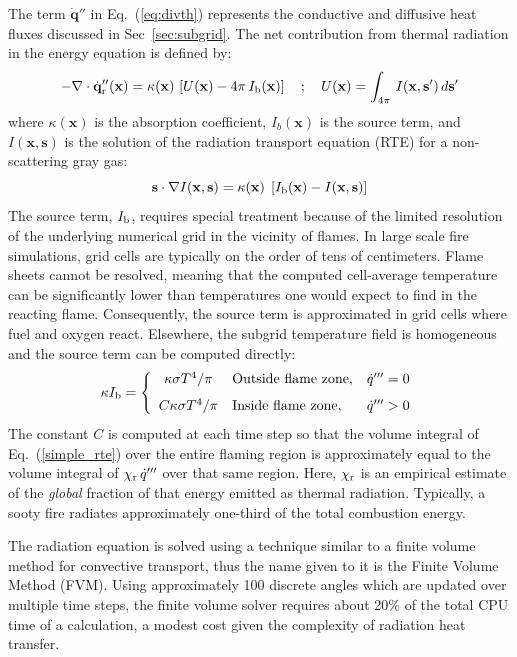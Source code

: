 \documentclass[journal,article,atmosphere,submit,moreauthors,pdftex]{Definitions_Review_Process/mdpi}
\newcommand{\bx}{\mathbf{x}}
\newcommand{\bs}{\mathbf{s}}
\begin{document}
The term $\dot{\mathbf{q}}''$ in Eq.~(\ref{eq:divth}) represents the conductive and diffusive heat fluxes discussed in Sec~\ref{sec:subgrid}. The net contribution from thermal radiation in the energy equation is defined by:
\begin{equation}
   -\nabla \cdot \dot{\mathbf{q}}_{\rm r}''(\bx) =
    \kappa(\bx) \, \left[ U(\bx) - 4 \pi \, I_{\rm b}(\bx) \right]  \quad ; \quad
    U(\bx) = \int_{4\pi} \, I(\bx,\bs') \, d\bs'  \label{simple_rte}
\end{equation}
where $\kappa(\bx)$ is the absorption coefficient, $I_b(\bx)$ is the source term, and $I(\bx,\bs)$ is the solution of the radiation transport equation (RTE) for a non-scattering gray gas:
\begin{equation}
   \bs \cdot \nabla I(\bx,\bs) = \kappa(\bx) \; \left[ I_{\rm b}(\bx) - I(\bx,\bs) \right] \label{bandRTE1}
\end{equation}
The source term, $I_{\rm b}$, requires special treatment because of the limited resolution of the underlying numerical grid in the vicinity of flames. In large scale fire simulations, grid cells are typically on the order of
tens of centimeters. Flame sheets cannot be resolved, meaning that the computed cell-average temperature can be significantly lower than temperatures one would expect to find in the reacting flame. Consequently, the
source term is approximated in grid cells where fuel and oxygen react. Elsewhere, the subgrid temperature field is homogeneous and the source term can be computed directly:
\begin{equation} \kappa I_{\rm b} = \left\{ \begin{array}{cll}
    \kappa \sigma T^4/\pi      & \hbox{Outside flame zone}, & \dot{q}'''=0  \\ [0.1in]
    C \kappa \sigma T^4/\pi  & \hbox{Inside flame zone}, & \dot{q}'''>0
    \end{array} \right.  \label{radapprox1}
\end{equation}
The constant $C$ is computed at each time step so that the volume integral of Eq.~(\ref{simple_rte}) over the entire flaming region is approximately equal to the volume integral of $\chi_{\rm r} \,\dot{q}'''$ over that same region. Here, $\chi_{\rm r}$ is an empirical estimate of the {\em global} fraction of that energy emitted as thermal radiation. Typically, a sooty fire radiates approximately one-third of the total combustion energy.

The radiation equation is solved using a technique similar to a finite volume method for convective transport, thus the name given to it is the Finite Volume Method (FVM). Using approximately 100 discrete angles which are updated over multiple time steps, the finite volume solver requires about 20\% of the total CPU time of a calculation, a modest cost given the complexity of radiation heat transfer.
\end{document}
